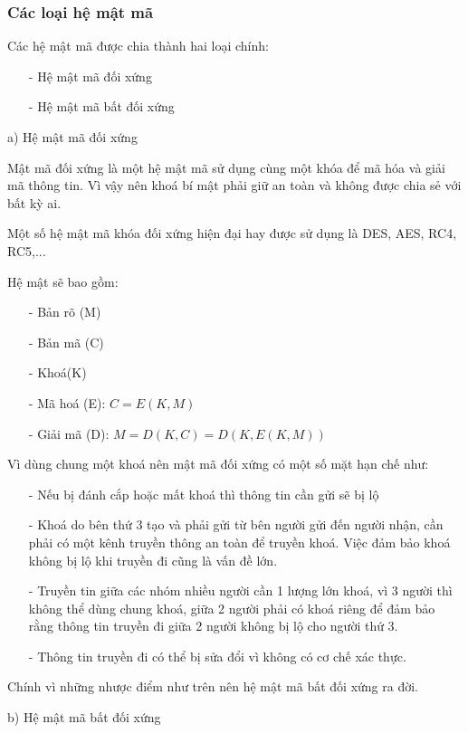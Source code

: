 \subsubsection{Các loại hệ mật mã}
Các hệ mật mã được chia thành hai loại chính: 
\begin{itemize}
    \item[-] Hệ mật mã đối xứng
    \item[-] Hệ mật mã bất đối xứng
\end{itemize}

a) Hệ mật mã đối xứng

Mật mã đối xứng là một hệ mật mã sử dụng cùng một khóa để mã hóa và giải mã thông tin.
Vì vậy nên khoá bí mật phải giữ an toàn và không được chia sẻ với bất kỳ ai.

Một số hệ mật mã khóa đối xứng hiện đại hay được sử dụng là DES, AES, RC4, RC5,...

Hệ mật sẽ bao gồm:
\begin{itemize}
    \item[-] Bản rõ (M)
    \item[-] Bản mã (C)
    \item[-] Khoá(K)
    \item[-] Mã hoá (E): $C = E(K,M)$
    \item[-] Giải mã (D): $M = D(K,C) = D(K,E(K,M))$
\end{itemize}

Vì dùng chung một khoá nên mật mã đối xứng có một số mặt hạn chế như:
\begin{itemize}
    \item[-] Nếu bị đánh cắp hoặc mất khoá thì thông tin cần gửi sẽ bị lộ
    \item[-] Khoá do bên thứ 3 tạo và phải gửi từ bên người gửi đến người nhận, 
    cần phải có một kênh truyền thông an toàn để truyền khoá. Việc đảm bảo khoá 
    không bị lộ khi truyền đi cũng là vấn đề lớn.
    \item[-] Truyền tin giữa các nhóm nhiều người cần 1 lượng lớn khoá, vì 3 người 
    thì không thể dùng chung khoá, giữa 2 người phải có khoá riêng để đảm bảo rằng
    thông tin truyền đi giữa 2 người không bị lộ cho người thứ 3.
    \item[-] Thông tin truyền đi có thể bị sửa đổi vì không có cơ chế xác thực.    
\end{itemize}

Chính vì những nhược điểm như trên nên hệ mật mã bất đối xứng ra đời.

b) Hệ mật mã bất đối xứng

